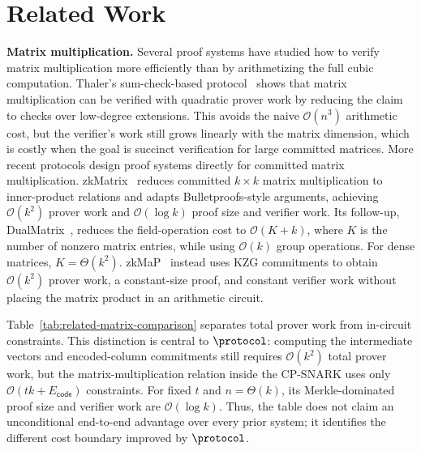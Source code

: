 \section{Related Work}
\label{sec:related}

\noindent\textbf{Matrix multiplication.}
Several proof systems have studied how to verify matrix multiplication more
efficiently than by arithmetizing the full cubic computation. Thaler's
sum-check-based protocol~\cite{thaler2013time} shows that matrix multiplication
can be verified with quadratic prover work by reducing the claim to checks over
low-degree extensions. This avoids the naive \(\mathcal{O}(n^3)\) arithmetic
cost, but the verifier's work still grows linearly with the matrix dimension,
which is costly when the goal is succinct verification for large committed
matrices.
More recent protocols design proof systems directly for committed matrix
multiplication. zkMatrix~\cite{cong2024zkmatrix} reduces committed
\(k\times k\) matrix multiplication to inner-product relations and adapts
Bulletproofs-style arguments, achieving \(\mathcal{O}(k^2)\) prover work and
\(\mathcal{O}(\log k)\) proof size and verifier work. Its follow-up,
DualMatrix~\cite{cong2026dualmatrix}, reduces the field-operation cost to
\(\mathcal{O}(K+k)\), where \(K\) is the number of nonzero matrix entries, while
using \(\mathcal{O}(k)\) group operations. For dense matrices,
\(K=\Theta(k^2)\). zkMaP~\cite{zkMaP} instead uses KZG commitments to obtain
\(\mathcal{O}(k^2)\) prover work, a constant-size proof, and constant verifier
work without placing the matrix product in an arithmetic circuit.

Table~\ref{tab:related-matrix-comparison} separates total prover work from
in-circuit constraints. This distinction is central to \(\protocol\): computing
the intermediate vectors and encoded-column commitments still requires
\(\mathcal{O}(k^2)\) total prover work, but the matrix-multiplication relation
inside the CP-SNARK uses only
\(\mathcal{O}(tk+E_{\mathsf{code}})\) constraints. For fixed \(t\) and
\(n=\Theta(k)\), its Merkle-dominated proof size and verifier work are
\(\mathcal{O}(\log k)\). Thus, the table does not claim an unconditional
end-to-end advantage over every prior system; it identifies the different cost
boundary improved by \(\protocol\).

